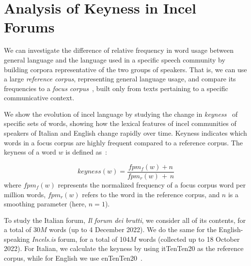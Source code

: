 \documentclass[11pt]{article}
\newcommand{\todoA}[1]{\todo[color=blue!40]{A: #1}}
\begin{document}



\appendix

\section{Analysis of Keyness in Incel Forums}
\label{app:keyness}


We can investigate the difference of relative frequency in word usage between general language and the language used in a specific speech community by building corpora representative of the two groups of speakers. That is, we can use a large \textit{reference corpus},
representing general language usage, and compare its frequencies to a \textit{focus corpus}~\cite{kilgarriff2009simple}, built only from texts pertaining to a specific communicative context.

We show the evolution of incel language by studying the change in
\textit{keyness}~\cite{kilgarriff2009simple}
of specific sets of words, showing how the lexical features of incel
communities of speakers of Italian and English
change rapidly over time.
Keyness indicates which words in a focus corpus are highly frequent compared to a reference corpus.
The keyness of a word $w$ is defined as~\cite{lexical_computing_2015}:%

\begin{equation}
keyness(w) = \frac{fpm_f(w) + n}
                {fpm_r(w)\, + \,n}
\end{equation}
%
where $fpm_f(w)$ represents the normalized frequency of a focus corpus word per million words, $fpm_r(w)$ refers to the word in the reference corpus, and $n$ is a smoothing parameter (here, $n=1$).

To study the Italian forum, \textit{Il forum dei brutti}, we consider all of its contents, for a total of 30$M$ words (up to 4 December 2022).
We do the same for the English-speaking \textit{Incels.is} forum, for a total of 104$M$ words (collected up to 18 October 2022).
For Italian, we calculate the keyness by using itTenTen20
as the reference corpus, while for English we use enTenTen20~\cite{tenten2013kilgarriff}.
\end{document}
